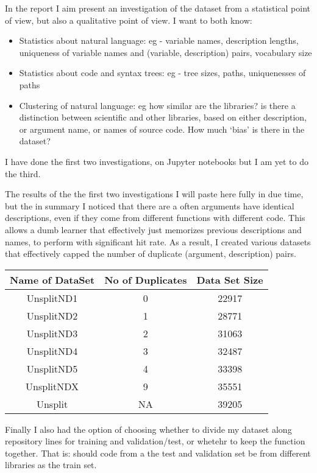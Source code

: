 In the report I aim present an investigation of the dataset from a statistical point of view, but also a qualitative point of view.
I want to both know: 
\begin{itemize}
    \item Statistics about natural language: eg - variable names, description lengths, uniqueness of variable names and (variable, description) pairs, vocabulary size
    \item Statistics about code and syntax trees: eg - tree sizes, paths, uniquenesses of paths
    \item Clustering of natural language: eg how similar are the libraries? is there a distinction between scientific and other libraries, based on either description, or argument name, or names of source code. How much `bias' is there in the dataset?
\end{itemize}

I have done the first two investigations, on Jupyter notebooks but I am yet to do the third.

The results of the the first two investigations I will paste here fully in due time, but the in summary I noticed that there are a often arguments have identical descriptions, even if they come from different functions with different code. 
This allows a dumb learner that effectively just memorizes previous descriptions and names, to perform with  significant hit rate.  
As a result, I created various datasets that effectively capped the number of duplicate (argument, description) pairs.

\begin{center}
\begin{tabular}{|| c | c | c ||}
  \hline
   Name of DataSet & No of Duplicates & Data Set Size \\
  \hline
   UnsplitND1 & 0 & 22917 \\
   UnsplitND2 & 1 & 28771 \\
   UnsplitND3 & 2 & 31063 \\
   UnsplitND4 & 3 & 32487 \\
   UnsplitND5 & 4 & 33398 \\
   UnsplitNDX & 9 & 35551 \\
   Unsplit    & NA & 39205\\ 
  \hline
\end{tabular}
\end{center}

Finally I also had the option of choosing whether to divide my dataset along repository lines for training and validation/test, or whetehr to keep the function together. 
That is: should code from a the test and validation set be from different libraries as the train set. 

